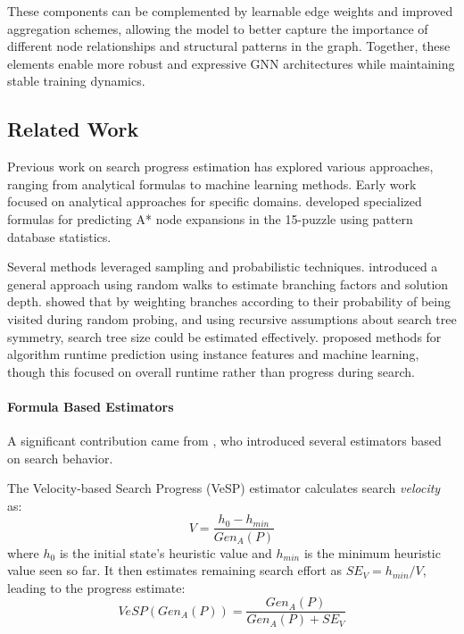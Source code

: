 \documentclass[letterpaper]{article}
\begin{document}
These components can be complemented by learnable edge weights and improved aggregation schemes, allowing the model to better capture the importance of different node relationships and structural patterns in the graph. Together, these elements enable more robust and expressive GNN architectures while maintaining stable training dynamics.


\subsection{Related Work}\label{subsec:related_work}

Previous work on search progress estimation has explored various approaches, ranging from analytical formulas to machine learning methods. Early work focused on analytical approaches for specific domains. \citet{breyer2008recent} developed specialized formulas for predicting A* node expansions in the 15-puzzle using pattern database statistics.

Several methods leveraged sampling and probabilistic techniques. \citet{lelis2014estimating} introduced a general approach using random walks to estimate branching factors and solution depth. \citet{kilby2006estimating} showed that by weighting branches according to their probability of being visited during random probing, and using recursive assumptions about search tree symmetry, search tree size could be estimated effectively. \citet{hutter2014algorithm} proposed methods for algorithm runtime prediction using instance features and machine learning, though this focused on overall runtime rather than progress during search.

\paragraph{Formula Based Estimators}
A significant contribution came from \citet{thayer2012we}, who introduced several estimators based on search behavior.

The Velocity-based Search Progress (VeSP) estimator calculates search \emph{velocity} as:
\begin{equation*}
    V = \frac{h_0 - h_{min}}{Gen_A(P)}
\end{equation*}
where $h_0$ is the initial state's heuristic value and $h_{min}$ is the minimum heuristic value seen so far. It then estimates remaining search effort as $SE_V = h_{min}/V$, leading to the progress estimate:
\begin{equation}
    VeSP(Gen_A(P)) = \frac{Gen_A(P)}{Gen_A(P) + SE_V}
\end{equation}
\end{document}
